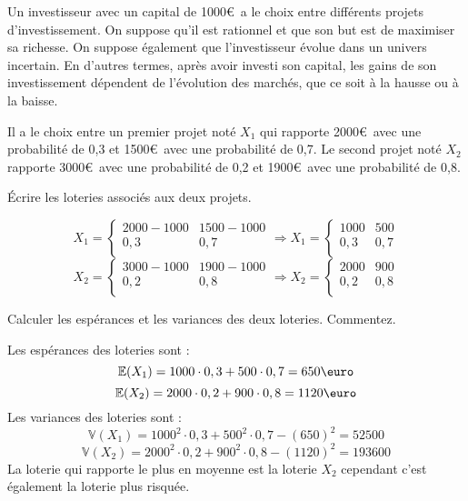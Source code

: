 \documentclass[12pt, a4paper]{exam}
\begin{document}
Un investisseur avec un capital de 1000\euro~a le choix entre différents projets d'investissement. On suppose qu'il est rationnel et que son but est de maximiser sa richesse. On suppose également que l'investisseur évolue dans un univers incertain. En d'autres termes, après avoir investi son capital, les gains de son investissement dépendent de l'évolution des marchés, que ce soit à la hausse ou à la baisse.

Il a le choix entre un premier projet noté  \( X_1 \)  qui rapporte 2000\euro~avec une probabilité de 0,3 et 1500\euro~avec une probabilité de 0,7. Le second projet noté  \( X_2 \) rapporte 3000\euro~avec une probabilité de 0,2 et 1900\euro~avec une probabilité de 0,8.

\begin{questions}
\question[1,25] Écrire les loteries associés aux deux projets. 

\begin{solution}
	\[ 
	X_1 =\left\{\begin{matrix}
		2000-1000 & 1500-1000  \\
		0,3 &  0,7\\
	\end{matrix}\right.\Rightarrow 
	X_1 =\left\{\begin{matrix}
		1000 & 500  \\
		0,3 &  0,7\\
	\end{matrix}\right.	
	 \]
	  \[ 
	  X_2 =\left\{\begin{matrix}
	  	3000-1000 & 1900-1000  \\
	  	0,2 &  0,8\\
	  \end{matrix}\right.\Rightarrow 
	   X_2 =\left\{\begin{matrix}
	  	2000 & 900  \\
	  	0,2 &  0,8\\
	  \end{matrix}\right.
	   \]
\end{solution}

\question[1,25] Calculer les espérances et les variances des deux loteries. Commentez.

\begin{solution} Les espérances des loteries sont :
\[ 
\mathbb{E}(X_1)=1000\cdot0,3+500\cdot0,7=650\text{\euro}
 \]
\[ 
\mathbb{E}(X_2)=2000\cdot0,2+900\cdot0,8=1120\text{\euro}
 \] 
Les variances des loteries sont :
\[ 
\mathbb{V}(X_1)=1000^2\cdot0,3+500^2\cdot0,7-(650)^2=52500
 \]
\[ 
\mathbb{V}(X_2)=2000^2\cdot0,2+900^2\cdot0,8-(1120)^2=193600
\]
La loterie qui rapporte le plus en moyenne est la loterie \(X_2\) cependant c'est également la loterie plus risquée.
\end{solution}


\end{questions}
\end{document}
